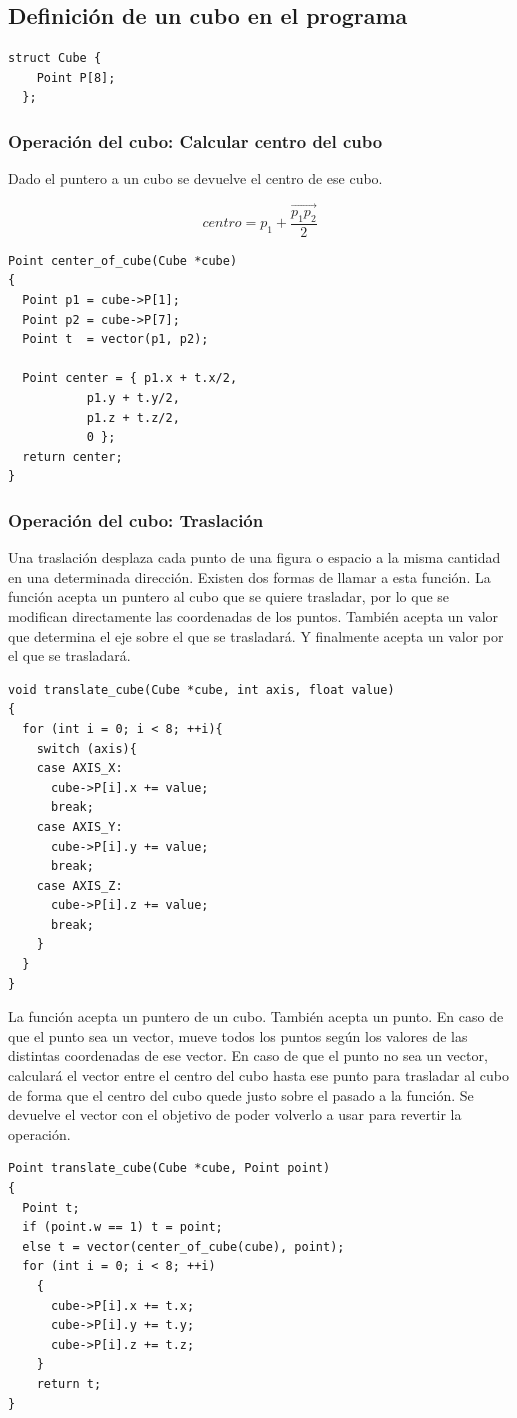 \documentclass{article}
\begin{document}
\subsection{Definición de un cubo en el programa}
\begin{lstlisting}[frame=single]
  struct Cube {
    Point P[8];
  };
\end{lstlisting}
\subsubsection{Operación del cubo: Calcular centro del cubo}
Dado el puntero a un cubo se devuelve el centro de ese cubo.

\begin{equation}
  centro = p_1 + \frac{\overrightarrow{p_1p_2}}{2}
\end{equation}

\begin{lstlisting}[frame=single]
Point center_of_cube(Cube *cube)
{
  Point p1 = cube->P[1];
  Point p2 = cube->P[7];
  Point t  = vector(p1, p2);

  Point center = { p1.x + t.x/2,
		   p1.y + t.y/2,
		   p1.z + t.z/2,
		   0 };
  return center;
}
\end{lstlisting}

\newpage

\subsubsection{Operación del cubo: Traslación}
Una traslación desplaza cada punto de una figura o espacio a la misma cantidad en una determinada dirección. Existen dos formas de llamar a esta función. \newline
La función acepta un puntero al cubo que se quiere trasladar, por lo que se modifican directamente las coordenadas de los puntos. También acepta un valor que determina el eje sobre el que se trasladará. Y finalmente acepta un valor por el que se trasladará.
\begin{lstlisting}[frame=single]
void translate_cube(Cube *cube, int axis, float value)
{
  for (int i = 0; i < 8; ++i){
    switch (axis){
    case AXIS_X:
      cube->P[i].x += value;
      break;
    case AXIS_Y:
      cube->P[i].y += value;
      break;
    case AXIS_Z:
      cube->P[i].z += value;
      break;
    }
  }
}
\end{lstlisting}
La función acepta un puntero de un cubo. También acepta un punto. En caso de que el punto sea un vector, mueve todos los puntos según los valores de las distintas coordenadas de ese vector. En caso de que el punto no sea un vector, calculará el vector entre el centro del cubo hasta ese punto para trasladar al cubo de forma que el centro del cubo quede justo sobre el pasado a la función. Se devuelve el vector con el objetivo de poder volverlo a usar para revertir la operación.
\begin{lstlisting}[frame=single]
Point translate_cube(Cube *cube, Point point)
{
  Point t;
  if (point.w == 1) t = point;
  else t = vector(center_of_cube(cube), point);
  for (int i = 0; i < 8; ++i)
    {
      cube->P[i].x += t.x;
      cube->P[i].y += t.y;
      cube->P[i].z += t.z;
    }
    return t;
}
\end{lstlisting}
\end{document}
